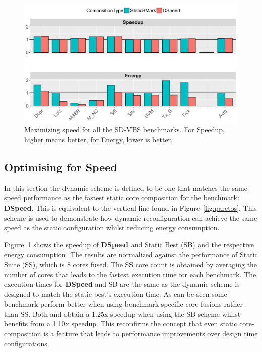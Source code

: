 \begin{figure}[t]
    \centering
	\includegraphics[width=1\textwidth]{cases-paper/graphics/results/speed_bars3.pdf}
    \caption{Maximizing speed for all the SD-VBS benchmarks. For Speedup, higher means better, for Energy, lower is better.}
    \label{fig:speedres}
	\vspace{1em}
\end{figure}

\subsection{Optimising for Speed} \label{sec:dyn:speed}

In this section the dynamic scheme is defined to be one that matches the same speed performance as the fastest static core composition for the benchmark: \textbf{DSpeed}.
This is equivalent to the vertical line found in Figure~\ref{fig:paretos}.
This scheme is used to demonstrate how dynamic reconfiguration can achieve the same speed as the static configuration whilst reducing energy consumption.

Figure~\ref{fig:speedres} shows the speedup of \textbf{DSpeed} and Static Best (SB) and the respective energy consumption.
The results are normalized against the performance of Static Suite (SS), which is 8 cores fused.
The SS core count is obtained by averaging the number of cores that leads to the fastest execution time for each benchmark.
The execution times for \textbf{DSpeed} and SB are the same as the dynamic scheme is designed to match the static best's execution time.
As can be seen some benchmark perform better when using benchmark specific core fusions rather than SS.
Both  and  obtain a 1.25x speedup when using the SB scheme whilst  benefits from a 1.10x speedup.
This reconfirms the concept that even static core-composition is a feature that leads to performance improvements over design time configurations.


